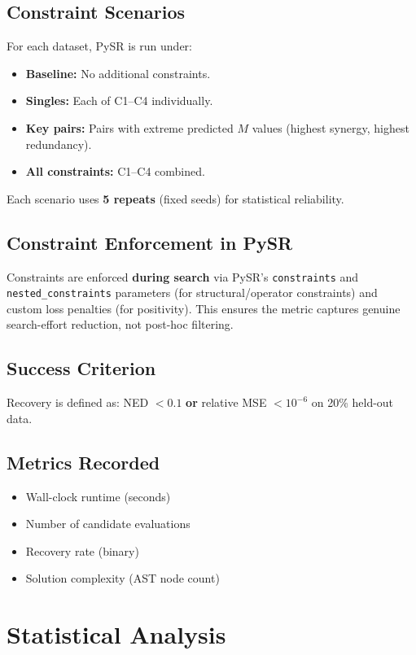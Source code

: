 \documentclass[11pt,a4paper]{article}
\begin{document}
\subsection{Constraint Scenarios}
For each dataset, PySR is run under:
\begin{itemize}
  \item \textbf{Baseline:} No additional constraints.
  \item \textbf{Singles:} Each of C1--C4 individually.
  \item \textbf{Key pairs:} Pairs with extreme predicted $M$ values (highest synergy, highest redundancy).
  \item \textbf{All constraints:} C1--C4 combined.
\end{itemize}
Each scenario uses \textbf{5 repeats} (fixed seeds) for statistical reliability.

\subsection{Constraint Enforcement in PySR}
Constraints are enforced \textbf{during search} via PySR's \texttt{constraints} and \texttt{nested\_constraints} parameters (for structural/operator constraints) and custom loss penalties (for positivity). This ensures the metric captures genuine search-effort reduction, not post-hoc filtering.

\subsection{Success Criterion}
Recovery is defined as: NED $< 0.1$ \textbf{or} relative MSE $< 10^{-6}$ on 20\% held-out data.

\subsection{Metrics Recorded}
\begin{itemize}
  \item Wall-clock runtime (seconds)
  \item Number of candidate evaluations
  \item Recovery rate (binary)
  \item Solution complexity (AST node count)
\end{itemize}

\section{Statistical Analysis}
\label{sec:stats}
\end{document}

